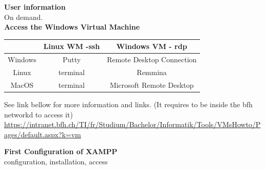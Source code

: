 \documentclass{scrartcl}
\begin{document}
\textbf{User information} \\
On demand.\\

\textbf{Access the Windows Virtual Machine}\\
\begin{center}
  \begin{tabular}{|c|c|c|}
    \hline
     & Linux WM -ssh & Windows VM - rdp \\
    \hline
    Windows & Putty & Remote Desktop Connection \\
    \hline
    Linux & terminal & Remmina \\
    \hline
    MacOS & terminal & Microsoft Remote Desktop \\
    \hline
  \end{tabular}
\end{center}

See link bellow for more information and links. (It requires to be inside the bfh networkd to access it)
\url{https://intranet.bfh.ch/TI/fr/Studium/Bachelor/Informatik/Tools/VMsHowto/Pages/default.aspx?k=vm}

\textbf{First Configuration of XAMPP}\\
configuration, installation, access
\end{document}
